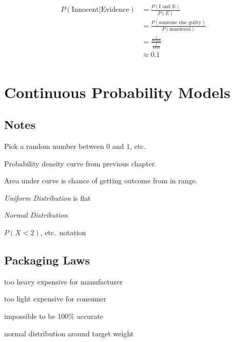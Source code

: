 \documentclass[letterpaper, landscape]{exam}
\begin{document}
  \begin{align*}
    P(\text{Innocent} | \text{Evidence}) & = \frac{P(\text{I and E})}{P(E)} \\
                                         & = \frac{P(\text{someone else guilty})}{P(\text{murdered})} \\
                                         & = \frac{\frac{1}{\num{ 87 500 }}}{\frac{1}{8800}} \\
                                         & \approx 0.1 \\
  \end{align*}


  \section{Continuous Probability Models}

  \subsection{Notes}
  \begin{itemize*}
    \item Pick a random number between 0 and 1, etc.

    \item Probability density curve from previous chapter. 
  
    \item Area under curve is chance of getting outcome from in range.

    \item {\em Uniform Distribution\/} is flat

    \item {\em Normal Distribution\/}

    \item $P(X < 2)$, etc.\ notation

  \end{itemize*}

  \subsection{Packaging Laws}
  \begin{itemize*}
    \item too heavy expensive for manufacturer
    \item too light expensive for consumer
    \item impossible to be 100\% accurate
    \item normal distribution around target weight
  \end{itemize*}
\end{document}
